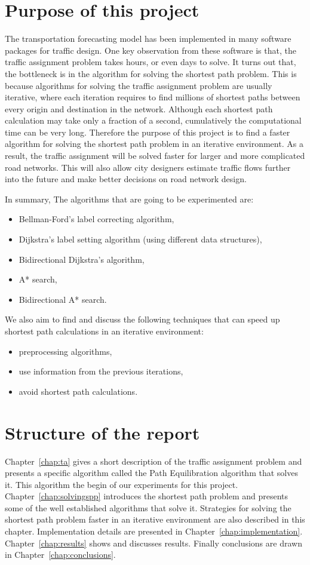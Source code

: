 \section{Purpose of this project}
The transportation forecasting model has been implemented in many software packages for traffic design.
One key observation from these software is that,
the traffic assignment problem takes hours, or even days to solve.
It turns out that,
the bottleneck is in the algorithm for solving the shortest path problem.
This is because algorithms for solving the traffic assignment problem are usually iterative,
where each iteration requires to find millions of shortest paths between every origin and destination in the network.
Although each shortest path calculation may take only a fraction of a second,
cumulatively the computational time can be very long.
Therefore the purpose of this project is to find a faster algorithm for solving the shortest path problem in an iterative environment.
As a result, the traffic assignment will be solved faster
for larger and more complicated road networks.
This will also allow city designers estimate traffic flows further into the future and make better decisions on road network design.

In summary,
The algorithms that are going to be experimented are:
\begin{itemize}
    \item Bellman-Ford's label correcting algorithm,
    \item Dijkstra's label setting algorithm (using different data structures),
    \item Bidirectional Dijkstra's algorithm,
    \item A* search,
    \item Bidirectional A* search.
\end{itemize}

We also aim to find and discuss the following techniques that can speed up shortest path calculations in an iterative environment:
\begin{itemize}
    \item preprocessing algorithms,
    \item use information from the previous iterations,
    \item avoid shortest path calculations.
\end{itemize}

\section{Structure of the report}
Chapter~\ref{chap:ta} gives a short description of the traffic assignment problem
and presents a specific algorithm called the Path Equilibration algorithm that solves it.
This algorithm the begin of our experiments for this project.
Chapter~\ref{chap:solvingspp} introduces the shortest path problem and presents some of the well established algorithms that solve it.
Strategies for solving the shortest path problem faster in an iterative environment are also described in this chapter.
Implementation details are presented in Chapter~\ref{chap:implementation}.
Chapter~\ref{chap:results} shows and discusses results.
Finally conclusions are drawn in Chapter~\ref{chap:conclusions}.
